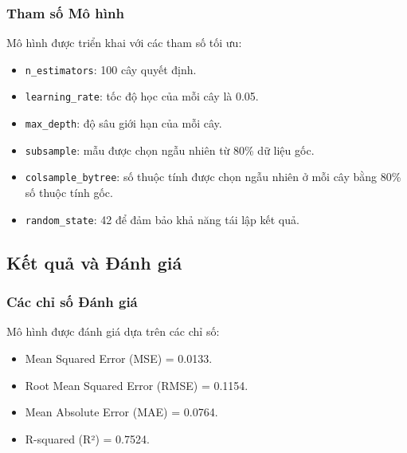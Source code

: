 \subsubsection{Tham số Mô hình}
Mô hình được triển khai với các tham số tối ưu:
\begin{itemize}
    \item \texttt{n\_estimators}: 100 cây quyết định.
    \item \texttt{learning\_rate}: tốc độ học của mỗi cây là 0.05. 
    \item \texttt{max\_depth}: độ sâu giới hạn của mỗi cây. 
    \item \texttt{subsample}: mẫu được chọn ngẫu nhiên từ 80\% dữ liệu gốc.
    \item \texttt{colsample\_bytree}: số thuộc tính được chọn ngẫu nhiên ở mỗi cây bằng 80\% số thuộc tính gốc. 
    \item \texttt{random\_state}: 42 để đảm bảo khả năng tái lập kết quả.
\end{itemize}

\subsection{Kết quả và Đánh giá}

\subsubsection{Các chỉ số Đánh giá}
Mô hình được đánh giá dựa trên các chỉ số:
\begin{itemize}
    \item Mean Squared Error (MSE) = 0.0133.
    \item Root Mean Squared Error (RMSE) = 0.1154.
    \item Mean Absolute Error (MAE) = 0.0764.
    \item R-squared (R²) = 0.7524.
\end{itemize}

